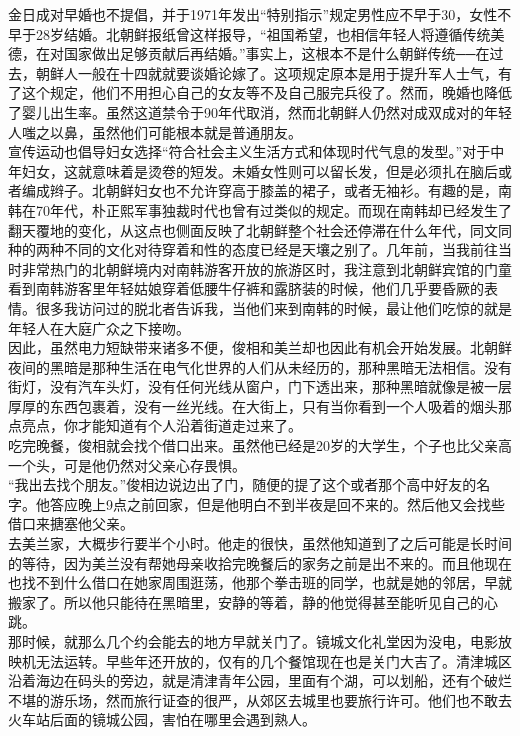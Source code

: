 金日成对早婚也不提倡，并于1971年发出“特别指示”规定男性应不早于30，女性不早于28岁结婚。北朝鲜报纸曾这样报导，“祖国希望，也相信年轻人将遵循传统美德，在对国家做出足够贡献后再结婚。”事实上，这根本不是什么朝鲜传统──在过去，朝鲜人一般在十四就就要谈婚论嫁了。这项规定原本是用于提升军人士气，有了这个规定，他们不用担心自己的女友等不及自己服完兵役了。然而，晚婚也降低了婴儿出生率。虽然这道禁令于90年代取消，然而北朝鲜人仍然对成双成对的年轻人嗤之以鼻，虽然他们可能根本就是普通朋友。\\

宣传运动也倡导妇女选择“符合社会主义生活方式和体现时代气息的发型。”对于中年妇女，这就意味着是烫卷的短发。未婚女性则可以留长发，但是必须扎在脑后或者编成辫子。北朝鲜妇女也不允许穿高于膝盖的裙子，或者无袖衫。有趣的是，南韩在70年代，朴正熙军事独裁时代也曾有过类似的规定。而现在南韩却已经发生了翻天覆地的变化，从这点也侧面反映了北朝鲜整个社会还停滞在什么年代，同文同种的两种不同的文化对待穿着和性的态度已经是天壤之别了。几年前，当我前往当时非常热门的北朝鲜境内对南韩游客开放的旅游区时，我注意到北朝鲜宾馆的门童看到南韩游客里年轻姑娘穿着低腰牛仔裤和露脐装的时候，他们几乎要昏厥的表情。很多我访问过的脱北者告诉我，当他们来到南韩的时候，最让他们吃惊的就是年轻人在大庭广众之下接吻。\\

因此，虽然电力短缺带来诸多不便，俊相和美兰却也因此有机会开始发展。北朝鲜夜间的黑暗是那种生活在电气化世界的人们从未经历的，那种黑暗无法相信。没有街灯，没有汽车头灯，没有任何光线从窗户，门下透出来，那种黑暗就像是被一层厚厚的东西包裹着，没有一丝光线。在大街上，只有当你看到一个人吸着的烟头那点亮点，你才能知道有个人沿着街道走过来了。\\

吃完晚餐，俊相就会找个借口出来。虽然他已经是20岁的大学生，个子也比父亲高一个头，可是他仍然对父亲心存畏惧。\\

“我出去找个朋友。”俊相边说边出了门，随便的提了这个或者那个高中好友的名字。他答应晚上9点之前回家，但是他明白不到半夜是回不来的。然后他又会找些借口来搪塞他父亲。\\

去美兰家，大概步行要半个小时。他走的很快，虽然他知道到了之后可能是长时间的等待，因为美兰没有帮她母亲收拾完晚餐后的家务之前是出不来的。而且他现在也找不到什么借口在她家周围逛荡，他那个拳击班的同学，也就是她的邻居，早就搬家了。所以他只能待在黑暗里，安静的等着，静的他觉得甚至能听见自己的心跳。\\

那时候，就那么几个约会能去的地方早就关门了。镜城文化礼堂因为没电，电影放映机无法运转。早些年还开放的，仅有的几个餐馆现在也是关门大吉了。清津城区沿着海边在码头的旁边，就是清津青年公园，里面有个湖，可以划船，还有个破烂不堪的游乐场，然而旅行证查的很严，从郊区去城里也要旅行许可。他们也不敢去火车站后面的镜城公园，害怕在哪里会遇到熟人。\\

